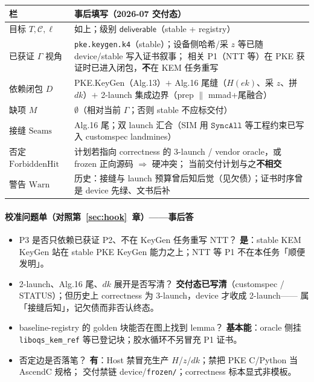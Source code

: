 \documentclass[UTF8,a4paper,11pt]{ctexart}
\theoremstyle{definition}
\theoremstyle{plain}
\theoremstyle{remark}
\numberwithin{figure}{section}
\numberwithin{table}{section}
\begin{document}
\begin{center}
\small
\begin{tabular}{@{}L{2.8cm}L{11.0cm}@{}}
  \toprule
  栏 & 事后填写（2026-07 交付态） \\
  \midrule
  目标 $T,\mathcal{C},\ell$ &
  如上；级别 $\mathsf{deliverable}$（stable + registry） \\
  已获证 $\Gamma$ 视角 &
  \texttt{pke.keygen.k4}（stable）；设备侧哈希/采 $z$ 等已随 device/stable 写入证书叙事；
  相关 P1（NTT 等）在 PKE 获证时已进入闭包，\textbf{不}在 KEM 任务重写 \\
  依赖闭包 $D$ &
  PKE.KeyGen（Alg.13）$+$ Alg.16 尾缝（$H(\mathit{ek})$、采 $z$、拼 $\mathit{dk}$）$+$
  2-launch 集成边界（prep $\parallel$ mmad+尾融合） \\
  缺项 $M$ &
  $\emptyset$（相对当前 $\Gamma$；否则 stable 不应标交付） \\
  接缝 $\mathrm{Seams}$ &
  Alg.16 尾；双 launch 汇合（SIM 用 $\mathtt{SyncAll}$ 等工程约束已写入 customspec landmines） \\
  否定 $\mathrm{ForbiddenHit}$ &
  计划若指向 correctness 的 3-launch / vendor oracle，或 frozen 正向源码 $\Rightarrow$ 硬冲突；
  当前交付计划与之\textbf{不相交} \\
  警告 $\mathrm{Warn}$ &
  历史：接缝与 launch 预算曾后知后觉（见欠债）；证书时序曾是 device 先绿、文书后补 \\
  \bottomrule
\end{tabular}
\end{center}

\paragraph{校准问题单（对照第~\ref{sec:hook}~章）——事后答}
\begin{itemize}
  \item P3 是否只依赖已获证 P2、不在 KeyGen 任务重写 NTT？
        \textbf{是}：stable KEM KeyGen 站在 stable PKE KeyGen 能力之上；NTT 等 P1 不在本任务「顺便发明」。
  \item 2-launch、Alg.16 尾、$\mathit{dk}$ 展开是否写清？
        \textbf{交付态已写清}（customspec / STATUS）；但历史上 correctness 为 3-launch，device 才收成 2-launch——
        属「接缝后知」，记欠债而非否认终态。
  \item baseline-registry 的 golden 块能否在图上找到 lemma？
        \textbf{基本能}：oracle 侧挂 \texttt{liboqs\_kem\_ref} 等已登记块；胶水循环不另冒充 P1 证书。
  \item 否定边是否落笔？
        \textbf{有}：Host 禁冒充生产 $H$/$z$/$\mathit{dk}$；禁把 PKE C/Python 当 AscendC 规格；
        交付禁链 device/\texttt{frozen/}；correctness 标本显式非模板。
\end{itemize}
\end{document}
